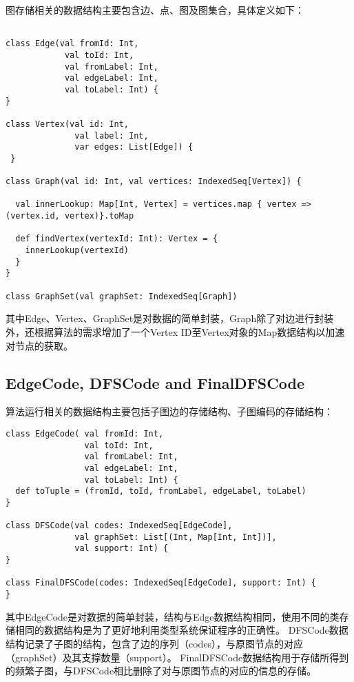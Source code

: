 \documentclass{article}
\begin{document}
图存储相关的数据结构主要包含边、点、图及图集合，具体定义如下：
\begin{lstlisting}[style=mStyle]

class Edge(val fromId: Int, 
            val toId: Int, 
            val fromLabel: Int, 
            val edgeLabel: Int, 
            val toLabel: Int) {
}

class Vertex(val id: Int, 
              val label: Int, 
              var edges: List[Edge]) {
 }

class Graph(val id: Int, val vertices: IndexedSeq[Vertex]) {

  val innerLookup: Map[Int, Vertex] = vertices.map { vertex => (vertex.id, vertex)}.toMap

  def findVertex(vertexId: Int): Vertex = {
    innerLookup(vertexId)
  }
}

class GraphSet(val graphSet: IndexedSeq[Graph])
\end{lstlisting}

其中Edge、Vertex、GraphSet是对数据的简单封装，Graph除了对边进行封装外，还根据算法的需求增加了一个Vertex ID至Vertex对象的Map数据结构以加速对节点的获取。



\subsection{EdgeCode, DFSCode and FinalDFSCode}

算法运行相关的数据结构主要包括子图边的存储结构、子图编码的存储结构：

\begin{lstlisting}[style=mStyle]
class EdgeCode( val fromId: Int, 
                val toId: Int, 
                val fromLabel: Int, 
                val edgeLabel: Int, 
                val toLabel: Int) {
  def toTuple = (fromId, toId, fromLabel, edgeLabel, toLabel)
}

class DFSCode(val codes: IndexedSeq[EdgeCode], 
              val graphSet: List[(Int, Map[Int, Int])], 
              val support: Int) {
}

class FinalDFSCode(codes: IndexedSeq[EdgeCode], support: Int) {
}

\end{lstlisting}

其中EdgeCode是对数据的简单封装，结构与Edge数据结构相同，使用不同的类存储相同的数据结构是为了更好地利用类型系统保证程序的正确性。
DFSCode数据结构记录了子图的结构，包含了边的序列（codes），与原图节点的对应（graphSet）及其支撑数量（support）。
FinalDFSCode数据结构用于存储所得到的频繁子图，与DFSCode相比删除了对与原图节点的对应的信息的存储。
\end{document}

